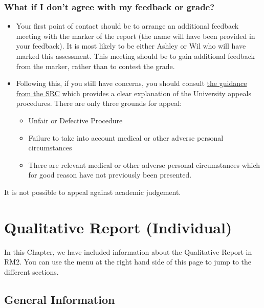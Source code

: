 \documentclass[
  english,
  letterpaper,
  DIV=11,
  numbers=noendperiod]{scrreprt}
\providecommand{\tightlist}{%
  \setlength{\itemsep}{0pt}\setlength{\parskip}{0pt}}
\begin{document}
\subsection{What if I don't agree with my feedback or
grade?}\label{what-if-i-dont-agree-with-my-feedback-or-grade-1}

\begin{itemize}
\item
  Your first point of contact should be to arrange an additional
  feedback meeting with the marker of the report (the name will have
  been provided in your feedback). It is most likely to be either Ashley
  or Wil who will have marked this assessment. This meeting should be to
  gain additional feedback from the marker, rather than to contest the
  grade.
\item
  Following this, if you still have concerns, you should consult
  \href{https://www.glasgowunisrc.org/advice/academic/appeals/}{the
  guidance from the SRC} which provides a clear explanation of the
  University appeals procedures. There are only three grounds for
  appeal:

  \begin{itemize}
  \tightlist
  \item
    Unfair or Defective Procedure
  \item
    Failure to take into account medical or other adverse personal
    circumstances
  \item
    There are relevant medical or other adverse personal circumstances
    which for good reason have not previously been presented.
  \end{itemize}
\end{itemize}

It is not possible to appeal against academic judgement.

\chapter{Qualitative Report (Individual)}\label{ch4_AIS_report}

In this Chapter, we have included information about the Qualitative
Report in RM2. You can use the menu at the right hand side of this page
to jump to the different sections.

\section{General Information}\label{general-information-3}
\end{document}
